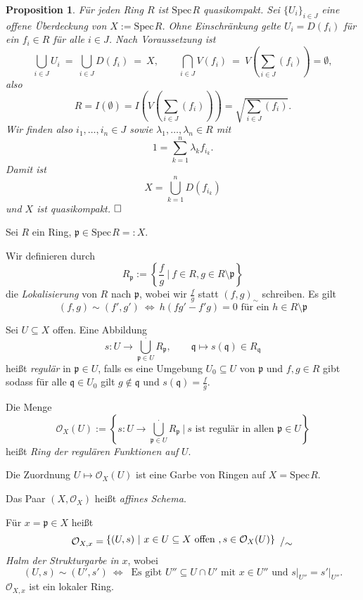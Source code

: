 \documentclass[11pt]{book}
\newtheorem{proposition}[theorem]{Proposition}
\theoremstyle{nonumberbreak}
\newenvironment{pr}[1][]{\ifthenelse{\equal{#1}{}}{\proof}{\proof[#1]}\rm}{\endproof}
\newenvironment{erinndefin}[1][]{\ifthenelse{\equal{#1}{}}{\erinndefini}{\erinndefini[#1]}\rm}{\enderinndefini}
\newcommand{\spec}{\mathrm{Spec} \hspace{1pt} }
\newcommand{\p}{\mathfrak{p}}
\newcommand{\q}{\mathfrak{q}}
\newcommand{\bigslant}[2]{{\raisebox{.2em}{$#1$}\left/\raisebox{-.2em}{$#2$}\right.}}
\begin{document}
\begin{spacing}{1.4}
\begin{proposition}    %
Für jeden Ring $R$ ist $\spec R$ quasikompakt.
\begin{pr}
Sei $\{U_i\}_{i \in J}$ eine offene Überdeckung von $X:= \spec R$. Ohne Einschränkung gelte $U_i = D(f_i)$ für ein $f_i \in R$ für alle $i \in J$. Nach Voraussetzung ist 
$$\bigcup_{i \in J} U_i \ = \ \bigcup_{i \in J} D(f_i) \ = \ X, \qquad \bigcap_{i \in J} V(f_i) \ = \ V \left( \sum_{i \in J} ( f_i ) \right) = \emptyset,$$
also 
$$R = I(\emptyset) = I \left( V \left( \sum_{i \in J } ( f_i ) \right) \right) = \sqrt{ \sum_{i \in J} ( f_i )}.$$
Wir finden also $i_1, \ldots, i_n \in J$ sowie $\lambda_1, \ldots, \lambda_n \in R$ mit 
$$1 = \sum_{k=1}^n \lambda_k f_{i_k}.$$
Damit ist 
$$X= \bigcup_{k=1}^n D\left(f_{i_k}\right)$$
und $X$ ist quasikompakt. $\hfill \Box$


\end{pr}
\end{proposition}

\newcommand{\bigcupdot}{\overset{\bf{.}}{\bigcup}}

\begin{erinndefin}    %
Sei $R$ ein Ring, $\p \in \spec R=:X$. 
\begin{compactenum}
\item Wir definieren durch 
$$R_{\p} := \left\{ \frac{f}{g} \ \bigg \vert \ f \in R, g \in R \setminus \p \right\}$$
die \textit{Lokalisierung} von $R$ nach $\p$, wobei wir $\frac{f}{g}$ statt $(f,g)_{\sim}$ schreiben. Es gilt
$$(f,g) \sim (f', g')\ \Longleftrightarrow \ h\left(fg'-f'g\right) = 0 \textrm{ für ein } h \in R\setminus \p$$
\item Sei $U \subseteq X$ offen. Eine Abbildung 
$$s: U \longrightarrow \bigcup_{ \p \in U}^{.} R_{\p}, \qquad \q \mapsto s(\q) \in R_{\q}$$
heißt \textit{regulär} in $\p \in U$, falls es eine Umgebung $U_0 \subseteq U$ von $\p$ und $f,g \in R$ gibt sodass für alle $\q \in U_0$ gilt $g \notin \q$ und $s(\q) = \frac{f}{g}.$
\item Die Menge
$$\mathcal{O}_X(U) := \left \{ s: U \longrightarrow \bigcup_{\p \in U}^{.} R_{\p} \ \bigg\vert \ s \textrm{ ist regulär in allen }\p \in U \right\}$$
heißt \textit{Ring der regulären Funktionen auf }$U$.
\item Die Zuordnung $U \mapsto \mathcal{O}_X(U)$ ist eine Garbe von Ringen auf $X=\spec R$.
\item Das Paar $(X, \mathcal{O}_X)$ heißt \textit{affines Schema}.
\item Für $x=\p \in X$ heißt
$$\mathcal{O}_{X,x} = \bigslant{\{ (U,s) \ \vert \ x \in U\subseteq X \textrm{ offen }, s \in \mathcal{O}_{X}(U) \} }{\sim}$$
\textit{Halm der Strukturgarbe in }$x$, wobei 
$$(U,s) \sim (U',s') \ \Longleftrightarrow \ \textrm{ Es gibt } U'' \subseteq U \cap U' \textrm{ mit } x \in U'' \textrm{ und } s \vert_{U''}= s'\vert_{U''}.$$
$\mathcal{O}_{X,x}$ ist ein lokaler Ring.
\end{compactenum}
\end{erinndefin}


\end{spacing}
\end{document}
